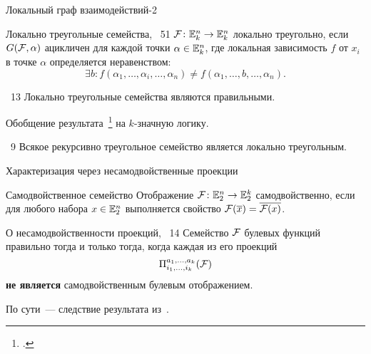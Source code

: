 \begin{frame}{Локальный граф взаимодействий-2}
    \begin{myexample}{Локально треугольные семейства, ~51}
        $\mathcal{F} \colon \mathbb{E}_k^n \to \mathbb{E}_k^n $ локально треугольно, если $G(\mathcal{F}, \alpha)$ ацикличен для каждой точки $\alpha \in \mathbb{E}_k^n$, где локальная зависимость $f$ от $x_i$ в точке $\alpha$ определяется неравенством:
        \[
            \exists b \colon f(\alpha_1, \ldots, \alpha_i, \ldots, \alpha_n) \ne f(\alpha_1, \ldots, b, \ldots, \alpha_n).
        \]
    \end{myexample}
    \pause 
    \begin{mytheorem}{\thm~13}
        Локально треугольные семейства являются правильными.
    \end{mytheorem}
    Обобщение результата~\footcite{shih2005combinatorial} на $k$-значную логику.
    \pause 
    \begin{mytheorem}{\lem~9}
        Всякое рекурсивно треугольное семейство является локально треугольным.
    \end{mytheorem}
\end{frame}


\begin{frame}{Характеризация через несамодвойственные проекции}
    \begin{block}{Самодвойственное семейство}
        Отображение $\mathcal{F} \colon \mathbb{E}_2^n \to \mathbb{E}_2^k$ самодвойственно, если для любого набора $x \in \mathbb{E}_2^n$ выполняется свойство $\mathcal{F}(\overline{x}) = \overline{\mathcal{F}(x)}$.
    \end{block}
    \pause 
    \begin{mytheorem}{О несамодвойственности проекций, \thm~14} 
        Семейство $\mathcal{F}$ булевых функций правильно тогда и только тогда, когда каждая из его проекций 
        \[
            \Pi^{a_1, \ldots, a_k}_{i_1, \ldots, i_k}(\mathcal{F})
        \] 
        \textbf{не является} самодвойственным булевым отображением.
    \end{mytheorem}
    По сути~--- следствие результата из~\cite{richard2015fixed}.
\end{frame}


